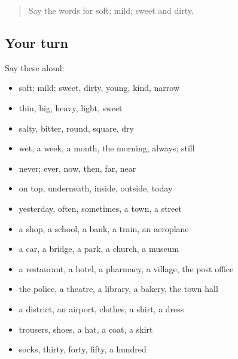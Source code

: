 \begin{quote}
Say the words for soft; mild; sweet and dirty.
\end{quote}

\subsection*{Your turn}
Say these aloud:

\begin{itemize}
\raggedright
  \item soft; mild; sweet, dirty, young, kind, narrow
  \item thin, big, heavy, light, sweet
  \item salty, bitter, round, square, dry
  \item wet, a week, a month, the morning, always; still
  \item never; ever, now, then, far, near
  \item on top, underneath, inside, outside, today
  \item yesterday, often, sometimes, a town, a street
  \item a shop, a school, a bank, a train, an aeroplane
  \item a car, a bridge, a park, a church, a museum
  \item a restaurant, a hotel, a pharmacy, a village, the post office
  \item the police, a theatre, a library, a bakery, the town hall
  \item a district, an airport, clothes, a shirt, a dress
  \item trousers, shoes, a hat, a coat, a skirt
  \item socks, thirty, forty, fifty, a hundred
\end{itemize}

